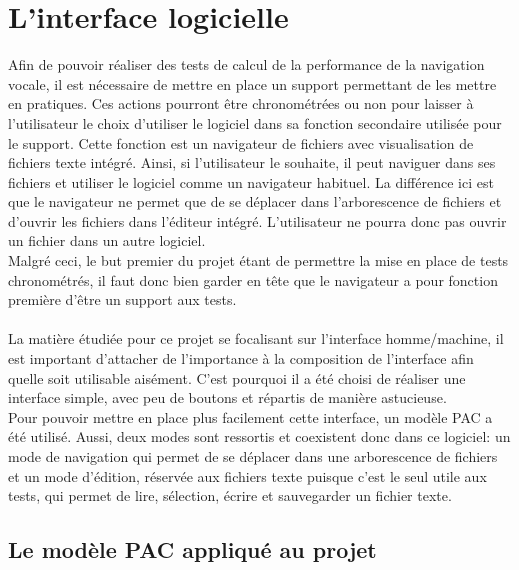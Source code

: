 \documentclass[a4paper, 11pt]{report}
\begin{document}
	\chapter{L'interface logicielle}
	
	
	Afin de pouvoir réaliser des tests de calcul de la performance de la navigation vocale, il est nécessaire de mettre en place un support permettant de les mettre en pratiques. Ces actions pourront \^etre chronométrées ou non pour laisser à l'utilisateur le choix d'utiliser le logiciel dans sa fonction secondaire utilisée pour le support. Cette fonction est un navigateur de fichiers avec visualisation de fichiers texte intégré. Ainsi, si l'utilisateur le souhaite, il peut naviguer dans ses fichiers et utiliser le logiciel comme un navigateur habituel. La différence ici est que le navigateur ne permet que de se déplacer dans l'arborescence de fichiers et d'ouvrir les fichiers dans l'éditeur intégré. L'utilisateur ne pourra donc pas ouvrir un fichier dans un autre logiciel. \\
	Malgré ceci, le but premier du projet étant de permettre la mise en place de tests chronométrés, il faut donc bien garder en t\^ete que le navigateur a pour fonction première d'\^etre un support aux tests.\\ \ \\	
	La matière étudiée pour ce projet se focalisant sur l'interface homme/machine, il est important d'attacher de l'importance à la composition de l'interface afin quelle soit utilisable aisément. C'est pourquoi il a été choisi de réaliser une interface simple, avec peu de boutons et répartis de manière astucieuse.\\
	Pour pouvoir mettre en place plus facilement cette interface, un modèle PAC a été utilisé.
	Aussi, deux modes sont ressortis et coexistent donc dans ce logiciel: un mode de navigation qui permet de se déplacer dans une arborescence de fichiers et un mode d'édition, réservée aux fichiers texte puisque c'est le seul utile aux tests, qui permet de lire, sélection, écrire et sauvegarder un fichier texte.
	
	\section{Le modèle PAC appliqué au projet}
	
\end{document}
